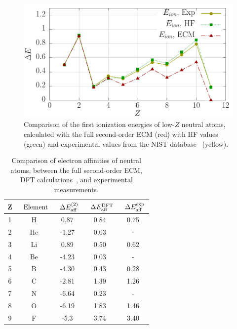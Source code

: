	\begin{figure} 
		\centering
		\includegraphics[width=120mm]{Graphs/Ionization.pdf} 
		\caption{Comparison of the first ionization energies of low-$Z$ neutral atoms, calculated with the full second-order ECM (red) with HF values~\cite{Saito2009836} (green) and experimental values from the NIST database~\cite{NIST} (yellow).} \label{Ionization}
		 		\end{figure}
	
	\begin{table}[b]%
    \centering
    \begin{tabular}{cc|ccc}
         Z &~$\rm{Element}$ &~$\Delta E^{(2)}_{\rm{aff}}$ &~$\Delta E^{\rm{DFT}}_{\rm{aff}}$ &~$\Delta E^{\rm{exp}}_{\rm{aff}}$ \\
        \hline
        \hline
         1 & H & 0.87 & 0.84 & 0.75 \\
         2 & He & -1.27 & 0.03 & - \\
         3 & Li & 0.89 & 0.50 & 0.62 \\
         4 & Be & -4.23 & 0.03 & - \\
         5 & B & -4.30 & 0.43 & 0.28 \\
         6 & C & -2.81 & 1.39 & 1.26 \\
         7 & N & -6.64 & 0.23 & - \\
         8 & O & -6.19 & 1.83 & 1.46 \\
         9 & F & -5.3 & 3.74 & 3.40 \\
         \hline
    \end{tabular}
    \caption{Comparison of electron affinities of neutral atoms, between the full second-order ECM, DFT calculations~\cite{DFTaffinities}, and experimental measurements.} %
    \label{tab:Affinities}
\end{table}

